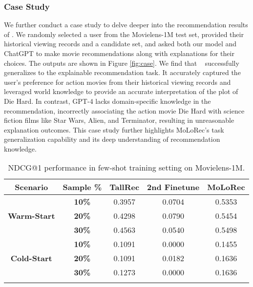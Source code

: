 \subsubsection{\textbf{Case Study}}
We further conduct a case study to delve deeper into the recommendation results of \shortname. 
We randomly selected a user from the Movielens-1M test set, provided their historical viewing records and a candidate set, and asked both our model and ChatGPT to make movie recommendations along with explanations for their choices.
The outputs are shown in Figure \ref{fig:case}.
We find that \shortname~ successfully generalizes to the explainable recommendation task.
It accurately captured the user's preference for action movies from their historical viewing records and leveraged world knowledge to provide an accurate interpretation of the plot of Die Hard. 
In contrast, GPT-4 lacks domain-specific knowledge in the recommendation, incorrectly associating the action movie Die Hard with science fiction films like Star Wars, Alien, and Terminator, resulting in unreasonable explanation outcomes.
This case study further highlights MoLoRec's task generalization capability and its deep understanding of recommendation knowledge.

\begin{table}[!t]
\small
\centering
\caption{NDCG@1 performance in few-shot training setting on Movielens-1M.}
\vspace{-2mm}
\label{tab:few-shot}
\begin{tabular}{ccccc}
\toprule
\textbf{Scenario} & \textbf{Sample \%} & \textbf{TallRec} & \textbf{2nd Finetune} & \textbf{MoLoRec} \\
\midrule
\multirow{3}{*}{\textbf{Warm-Start}} 
& \textbf{10\%}  & 0.3957  & 0.0704 & 0.5353 \\
& \textbf{20\%}  & 0.4298  & 0.0790 & 0.5454 \\
& \textbf{30\%}  & 0.4563  & 0.0540 & 0.5498 \\
\midrule
\multirow{3}{*}{\textbf{Cold-Start}} 
& \textbf{10\%}  & 0.1091  & 0.0000 & 0.1455 \\
& \textbf{20\%}  & 0.1091  & 0.0182 & 0.1636 \\
& \textbf{30\%}  & 0.1273  & 0.0000 & 0.1636 \\
\bottomrule
\vspace{-5mm}
\end{tabular}
\end{table}





